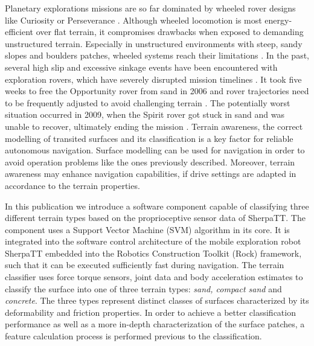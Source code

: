 \documentclass{article}
\begin{document}
Planetary explorations missions are so far dominated by wheeled rover designs like Curiosity
or Perseverance \cite{moeller2021, welch2013}. Although wheeled locomotion is most energy-efficient
over flat terrain, it compromises drawbacks when exposed to demanding unstructured
terrain. Especially in unstructured environments with steep, sandy slopes and boulders
patches, wheeled systems reach their limitations \cite{kolvenbach2021}. In the past, several high slip and
excessive sinkage events have been encountered with exploration rovers, which have severely
disrupted mission timelines \cite{gonzalez2018}. It took five weeks to free the Opportunity
rover from sand in 2006 \cite{young2006} and rover trajectories need to be frequently adjusted to avoid
challenging terrain \cite{arvidson2017}. The potentially worst situation occurred in 2009, when the
Spirit rover got stuck in sand and was unable to recover, ultimately ending the mission
\cite{webster2009}. 
Terrain awareness, the correct modelling of transited surfaces and its classification is a key factor for reliable autonomous navigation. 
Surface modelling can be used for navigation in order to avoid operation problems like the ones previously described. 
Moreover, terrain awareness may enhance navigation capabilities, if drive settings are adapted in accordance to the 
terrain properties.

In this publication we introduce a software component capable of classifying three different terrain types based on the proprioceptive sensor data of SherpaTT. 
The component uses a Support Vector Machine (SVM) algorithm \cite{vapnik1992,cristianini2000} in its core. It is integrated into the software control architecture of the mobile exploration robot SherpaTT embedded into the Robotics Construction Toolkit (Rock) framework, such that it can be executed sufficiently fast during navigation. The terrain classifier uses force torque sensors, joint data and body acceleration estimates to classify the surface into one of three terrain types: \emph{sand, compact sand} and \emph{concrete}.
The three types represent distinct classes of surfaces characterized by its deformability and friction properties. In order to achieve a better classification performance as well as a more in-depth characterization of the surface patches, a feature calculation process is performed previous to the classification. 
\end{document}
